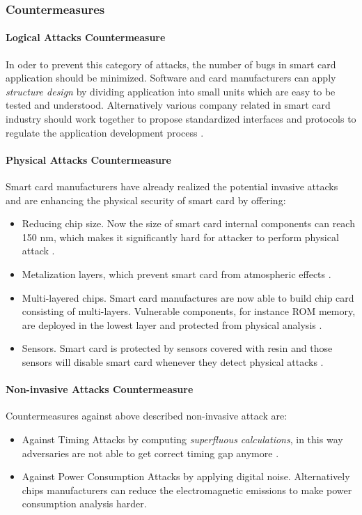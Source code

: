 \subsubsection{Countermeasures} \label{secSMD}
\paragraph{Logical Attacks Countermeasure}
In oder to prevent this category of attacks, the number of bugs in smart card application should be minimized. Software and card manufacturers can apply \emph{structure design} by dividing application into small units which are easy to be tested and understood. Alternatively various company related in smart card industry should work together to propose standardized interfaces and protocols to regulate the application development process \cite{smart_card_attack2}.
\paragraph{Physical Attacks Countermeasure}
Smart card manufacturers have already realized the potential  invasive attacks and are enhancing the physical security of smart card by offering:
\begin{itemize}
\item Reducing chip size. Now the size of smart card internal components can reach 150 nm, which makes it significantly hard for attacker to perform physical attack \cite{smart_card_attack3}.
\item Metalization layers, which prevent smart card from atmospheric effects \cite{smart_card_attack3}.
\item Multi-layered chips. Smart card manufactures are now able to build chip card consisting of multi-layers. Vulnerable components, for instance ROM memory, are deployed in the lowest layer and protected from physical analysis \cite{smart_card_attack3}. 
\item Sensors.  Smart card is protected by sensors covered with resin and those sensors will disable smart card whenever they detect physical attacks \cite{smart_card_attack}.
\end{itemize}
\paragraph{Non-invasive Attacks Countermeasure}
Countermeasures against above described non-invasive attack are:
\begin{itemize}
\item Against Timing Attacks by computing \emph{superfluous calculations}, in this way adversaries are not able  to get correct timing gap anymore \cite{smart_card_attack3} .
\item Against Power Consumption Attacks by applying digital noise. Alternatively chips manufacturers can reduce the electromagnetic emissions to make power consumption analysis  harder\cite{smart_card_attack3}.
\end{itemize}
